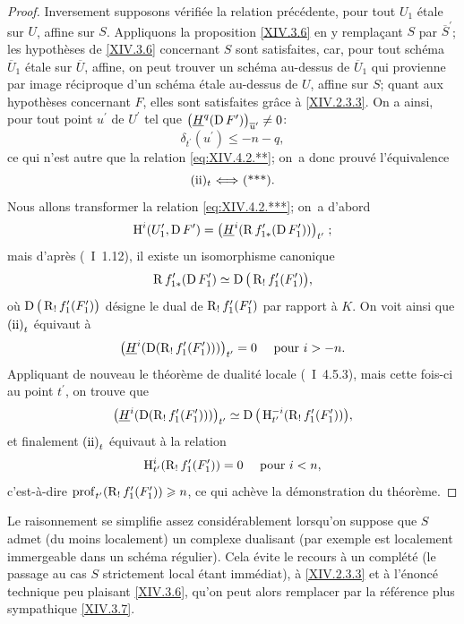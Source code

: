 \begin{proof}
Inversement supposons v\'erifi\'ee la relation pr\'ec\'edente, pour tout $U_{1}$ \'etale sur $U$, affine sur $S$. Appliquons la proposition \ref{XIV.3.6} en y rempla\c cant $S$ par $\overline{S}^{\prime}$; les hypoth\`eses de \ref{XIV.3.6} concernant $S$ sont satisfaites, car, pour tout sch\'ema $\overline{U}_{1}$ \'etale sur $\overline{U}$, affine, on peut trouver un sch\'ema au-dessus de $\overline{U}_{1}$ qui provienne par image r\'eciproque d'un sch\'ema \'etale au-dessus de $U$, affine sur $S$; quant aux hypoth\`eses concernant $F$, elles sont satisfaites gr\^ace \`a \ref{XIV.2.3.3}. On a ainsi, pour tout point $u^{\prime}$ de $U^{\prime}$ tel que $\big(\underline{H}^{q}(\operatorname{D} F^{\prime})\big)_{\overline{u}^{\prime}}\neq 0$:
$$
\delta_{t^{\prime}}(u^{\prime})\leq -n-q,
$$
ce qui n'est autre que la relation \eqref{eq:XIV.4.2.**}; on~a donc prouv\'e l'\'equivalence
$$
\text{(ii)$_{t}$~$\Ssi$~(***)}.
$$
Nous allons transformer la relation \eqref{eq:XIV.4.2.***}; on~a d'abord
$$
\operatorname{H}^{i}(U_{1}^{\prime}, \operatorname{D} F^{\prime})=\big(\underline{H}^{i}(\operatorname{R} f_{1\ast}^{\prime}(\operatorname{D} F_{1}^{\prime}))\big)_{t^{\prime}}\;;$$
mais d'apr\`es (~I~1.12), il existe un isomorphisme canonique
$$
\operatorname{R} f_{1\ast}^{\prime}(\operatorname{D} F_{1}^{\prime})\simeq\operatorname{D}\big(\operatorname{R}_{!}f_{1}^{\prime}(F_{1}^{\prime})\big),
$$
o\`u $\operatorname{D}\big(\operatorname{R}_{!}f_{1}^{\prime}(F_{1}^{\prime})\big)$ d\'esigne le dual de $\operatorname{R}_{!}f_{1}^{\prime}(F_{1}^{\prime})$ par rapport \`a $K$. On voit ainsi que $\textup{(ii)}_{t}$ \'equivaut \`a
$$
\big(\underline{H}^{i}(\operatorname{D}(\operatorname{R}_{!}f_{1}^{\prime}(F_{1}^{\prime})))\big)_{t^{\prime}}=0\quad\textrm{ pour }i>-n.
$$
Appliquant de nouveau le th\'eor\`eme de dualit\'e locale (~I~4.5.3), mais cette fois-ci au point $t^{\prime}$, on trouve que
$$
\big(\underline{H}^{i}(\operatorname{D}(\operatorname{R}_{!}f_{1}^{\prime}(F_{1}^{\prime})))\big)_{t^{\prime}}\simeq\operatorname{D}\big(\operatorname{H}_{t^{\prime}}^{-i}(\operatorname{R}_{!}f_{1}^{\prime}(F_{1}^{\prime}))\big),
$$
et finalement $\textup{(ii)}_{t}$ \'equivaut \`a la relation
$$
\operatorname{H}_{t^{\prime}}^{i}(\operatorname{R}_{!}f_{1}^{\prime}(F_{1}^{\prime}))=0\quad\textrm{ pour }i<n,
$$
c'est-\`a-dire $\operatorname{prof}_{t^{\prime}}(\operatorname{R}_{!}f_{1}^{\prime}(F_{1}^{\prime}))\geqslant n$, ce qui ach\`eve la d\'emonstration du th\'eor\`eme.
\skipqed
\end{proof}

\begin{subremarque} \label{XIV.4.2.3}
Le raisonnement se simplifie assez consid\'erablement lorsqu'on suppose que $S$ admet (du moins localement) un complexe dualisant (par exemple est localement immergeable dans un sch\'ema r\'egulier). Cela \'evite le recours \`a un compl\'et\'e (le passage au cas $S$ strictement local \'etant imm\'ediat), \`a \ref{XIV.2.3.3} et \`a l'\'enonc\'e technique peu plaisant \ref{XIV.3.6}, qu'on peut alors remplacer par la r\'ef\'erence plus sympathique \ref{XIV.3.7}.
\end{subremarque}

